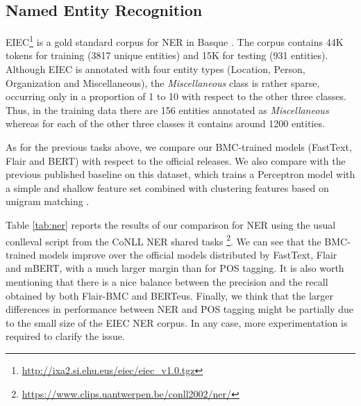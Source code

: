 \documentclass[10pt, a4paper]{article}
\begin{document}
\subsection{Named Entity Recognition}\label{sec:named-entity-recogn}

EIEC\footnote{\scriptsize{\url{http://ixa2.si.ehu.eus/eiec/eiec_v1.0.tgz}}} is a gold standard corpus for NER in Basque \cite{alegria2006lessons}. The corpus contains 44K tokens for training (3817 unique entities) and 15K for testing (931 entities). Although EIEC is annotated with four entity types (Location, Person, Organization and Miscellaneous), the \emph{Miscellaneous} class is rather sparse, occurring only in a proportion of 1 to 10 with respect to the other three classes. Thus, in the training data there are 156 entities annotated as \emph{Miscellaneous} whereas for each of the other three classes it contains around 1200 entities.

As for the previous tasks above, we compare our BMC-trained models (FastText, Flair and BERT) with respect to the official releases. We also compare with the previous published baseline on this dataset, which trains a Perceptron model with a simple and shallow feature set combined with clustering features based on unigram matching \cite{agerri2016robust}.

Table \ref{tab:ner} reports the results of our comparison for NER using the usual conlleval script from the CoNLL NER shared tasks \footnote{\scriptsize{\url{https://www.clips.uantwerpen.be/conll2002/ner/}}}. We can see that the BMC-trained models improve over the official models distributed by FastText, Flair and mBERT, with a much larger margin than for POS tagging. It is also worth mentioning that there is a nice balance between the precision and the recall obtained by both Flair-BMC and BERTeus. Finally, we think that the larger differences in performance between NER and POS tagging might be partially due to the small size of the EIEC NER corpus. In any case, more experimentation is required to clarify the issue.

\end{document}
